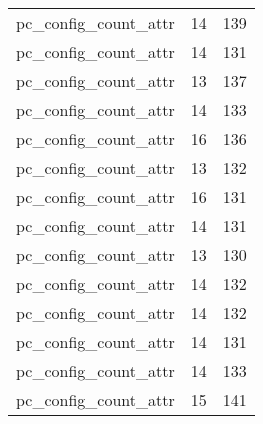 \begin{table}
\begin{tabular}{lrr}
            pc\_config\_count\_attr &        14 &       139 \\
            pc\_config\_count\_attr &        14 &       131 \\
            pc\_config\_count\_attr &        13 &       137 \\
            pc\_config\_count\_attr &        14 &       133 \\
            pc\_config\_count\_attr &        16 &       136 \\
            pc\_config\_count\_attr &        13 &       132 \\
            pc\_config\_count\_attr &        16 &       131 \\
            pc\_config\_count\_attr &        14 &       131 \\
            pc\_config\_count\_attr &        13 &       130 \\
            pc\_config\_count\_attr &        14 &       132 \\
            pc\_config\_count\_attr &        14 &       132 \\
            pc\_config\_count\_attr &        14 &       131 \\
            pc\_config\_count\_attr &        14 &       133 \\
            pc\_config\_count\_attr &        15 &       141 \\
\bottomrule
\end{tabular}
\end{table}
